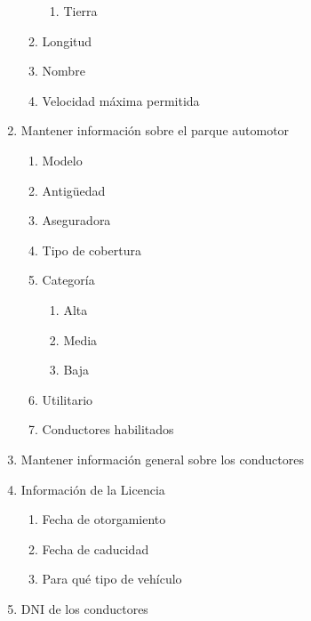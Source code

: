 \begin{enumerate}
\begin{enumerate}
\begin{enumerate}
					\item Tierra
				\end{enumerate}
			\item Longitud
			\item Nombre
			\item Velocidad máxima permitida
		\end{enumerate}
	\item{Mantener información sobre el parque automotor}
		\begin{enumerate}
			\item Modelo
			\item Antigüedad
			\item Aseguradora
			\item Tipo de cobertura
			\item Categoría 
				\begin{enumerate}
					\item Alta
					\item Media
					\item Baja
				\end{enumerate}
			\item{Utilitario}
			\item Conductores habilitados
		\end{enumerate}
	\item{Mantener información general sobre los conductores}
		\item Información de la Licencia
			\begin{enumerate}
				\item Fecha de otorgamiento
				\item Fecha de caducidad
				\item Para qué tipo de vehículo
			\end{enumerate}
		\item DNI de los conductores
\end{enumerate}